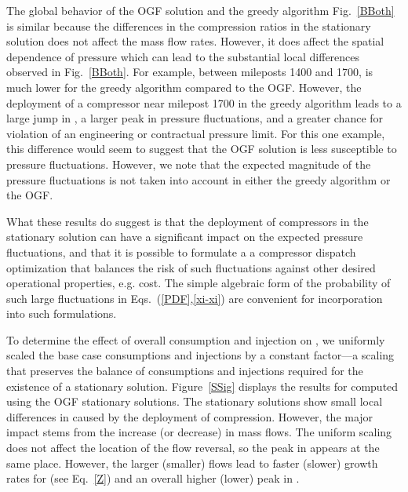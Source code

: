 \documentclass[10pt, conference, compsocconf]{IEEEtran}
\begin{document}
The global behavior of the OGF solution and the greedy algorithm  Fig.~\ref{BBoth} is similar because the differences in the compression ratios in the stationary solution does not affect the mass flow rates.  However, it does affect the spatial dependence of pressure which can lead to the substantial local differences observed in Fig.~\ref{BBoth}.
For example, between mileposts 1400 and 1700,  is much lower for the greedy algorithm compared to the OGF. However, the deployment of a compressor near milepost 1700 in the greedy algorithm leads to a large jump in , a larger peak in pressure fluctuations, and a greater chance for violation of an engineering or contractual pressure limit.  For this one example, this difference would seem to suggest that the OGF solution is less susceptible to pressure fluctuations.  However, we note that the expected magnitude of the pressure fluctuations is not taken into account in either the greedy algorithm or the OGF.

What these results do suggest is that the deployment of compressors in the stationary solution can have a significant impact on the expected pressure fluctuations, and that it is possible to formulate a a compressor dispatch optimization that balances the risk of such fluctuations against other desired operational properties, e.g. cost.  The simple algebraic form of the probability of such large fluctuations in Eqs.~(\ref{PDF},\ref{xi-xi}) are convenient for incorporation into such formulations.





To determine the effect of overall consumption and injection on ,
we uniformly scaled the base case consumptions and injections by a constant factor---a scaling that preserves the balance of consumptions and injections required for the existence of a stationary solution. Figure~\ref{SSig} displays the results for  computed using the OGF stationary solutions.  The stationary solutions show small local differences in  caused by the deployment of compression. However, the major impact stems from the increase (or decrease) in mass flows.  The uniform scaling does not affect the location of the flow reversal, so the peak in  appears at the same place.  However, the larger (smaller) flows lead to faster (slower) growth rates for  (see Eq.~\ref{Z}) and an overall higher (lower) peak in .
\end{document}
